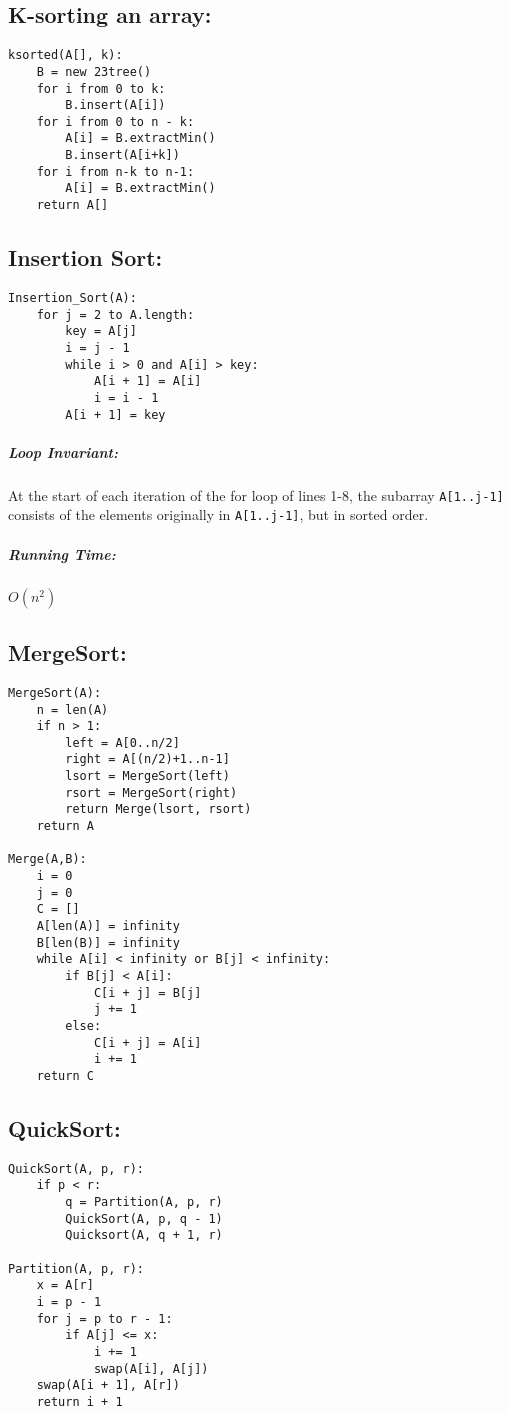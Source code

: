 \documentclass{article}
\newcommand{\code}[1]{\texttt{#1}}
\begin{document}
\subsection*{K-sorting an array: }
\begin{lstlisting}
ksorted(A[], k):
    B = new 23tree()
    for i from 0 to k:
        B.insert(A[i])
    for i from 0 to n - k:
        A[i] = B.extractMin()
        B.insert(A[i+k])
    for i from n-k to n-1:
        A[i] = B.extractMin()
    return A[]
\end{lstlisting}

\pagebreak{}

\subsection*{Insertion Sort:}

\begin{lstlisting}
Insertion_Sort(A):
    for j = 2 to A.length:
        key = A[j]
        i = j - 1
        while i > 0 and A[i] > key:
            A[i + 1] = A[i]
            i = i - 1
        A[i + 1] = key
\end{lstlisting}
\subparagraph*{Loop Invariant:} At the start of each iteration of the for loop of lines 1-8, the subarray \code{A[1..j-1]} consists of the elements originally in \code{A[1..j-1]}, but in sorted order.

\subparagraph*{Running Time:} \(O(n^2)\)

\subsection*{MergeSort:}
\begin{lstlisting}
MergeSort(A):
    n = len(A)
    if n > 1:
        left = A[0..n/2]
        right = A[(n/2)+1..n-1]
        lsort = MergeSort(left)
        rsort = MergeSort(right)
        return Merge(lsort, rsort)
    return A

Merge(A,B):
    i = 0
    j = 0
    C = []
    A[len(A)] = infinity
    B[len(B)] = infinity
    while A[i] < infinity or B[j] < infinity:
        if B[j] < A[i]:
            C[i + j] = B[j]
            j += 1
        else:
            C[i + j] = A[i]
            i += 1
    return C
\end{lstlisting}

\subsection*{QuickSort:}
\begin{lstlisting}
QuickSort(A, p, r):
    if p < r:
        q = Partition(A, p, r)
        QuickSort(A, p, q - 1)
        Quicksort(A, q + 1, r)

Partition(A, p, r):
    x = A[r]
    i = p - 1
    for j = p to r - 1:
        if A[j] <= x:
            i += 1
            swap(A[i], A[j])
    swap(A[i + 1], A[r])
    return i + 1
\end{lstlisting}
\end{document}
